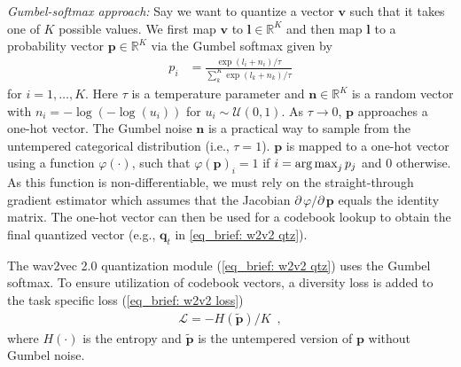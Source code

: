 {\textit{Gumbel-softmax approach:} 
Say we want to quantize a vector $\mathbf{v}$ such that it takes one of $K$ possible values. We first map $\mathbf{v}$ to $\mathbf{l} \in \mathbb{R}^K$ and then map $\mathbf{l}$ to a probability vector $\mathbf{p} \in \mathbb{R}^K$ via the Gumbel softmax given by
\begin{align}
    p_i &= \frac{\exp(l_i + n_i) / \tau}{\sum_k^K \exp(l_k + n_k) / \tau} 
\end{align}
for $i=1,\dots,K$. Here $\tau$ is a temperature parameter and $\mathbf{n}\in\mathbb R^K$ is a random vector with $n_i = -\log(-\log(u_i))$ for $u_i \sim \mathcal{U}(0, 1)$.
As  $\tau \rightarrow 0$, $\mathbf{p}$ approaches a one-hot vector. The Gumbel noise $\mathbf{n}$ is a practical way to sample from the untempered categorical distribution (i.e., $\tau = 1$).
$\mathbf{p}$ is mapped to a one-hot vector using a function $\varphi(\cdot)$, such that $\varphi(\mathbf{p})_i = 1$ if $i = \operatorname*{arg\,max}_j p_j$ and $0$ otherwise. 
As this function is non-differentiable, we must rely on the straight-through gradient estimator \parencite{bengio_estimating_2013} which assumes that the Jacobian ${\partial \, \varphi}/{\partial \, \mathbf{p}}$ equals the identity matrix. 
The one-hot vector can then be used for a codebook lookup to obtain the final quantized vector (e.g., $\mathbf{q}_t$ in \cref{eq_brief: w2v2 qtz}).

The wav2vec 2.0 quantization module (\cref{eq_brief: w2v2 qtz}) uses the Gumbel softmax. To ensure utilization of codebook vectors, a diversity loss is added to the task specific loss (\cref{eq_brief: w2v2 loss})
%
\begin{align}
    \mathcal{L} =  - H(\widetilde{\mathbf{p}}) / K \enspace,
\end{align}
\noindent where $H(\cdot)$ is the entropy and $\widetilde{\mathbf{p}}$ is the untempered version of $\mathbf{p}$ without Gumbel noise.

}
